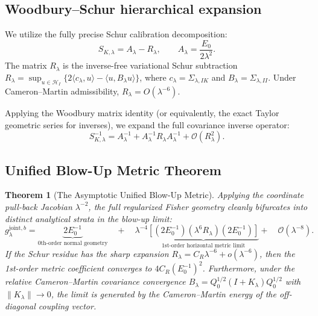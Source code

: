 \documentclass[11pt]{amsart}
\theoremstyle{plain}
\newtheorem{theorem}{Theorem}
\theoremstyle{definition}
\theoremstyle{remark}
\begin{document}
    \subsection{Woodbury--Schur hierarchical expansion}

    We utilize the fully precise Schur calibration decomposition:
    \begin{equation}
        S_{K,\lambda} = A_\lambda - R_\lambda, \qquad A_\lambda = \frac{E_0}{2\lambda^2}.
    \end{equation}
    The matrix $R_\lambda$ is the inverse-free variational Schur subtraction $R_\lambda = \sup_{u\in\mathcal H_I}\{2\langle c_\lambda,u\rangle-\langle u,B_\lambda u\rangle\}$, where $c_\lambda = \Sigma_{\lambda,IK}$ and $B_\lambda = \Sigma_{\lambda,II}$. Under Cameron--Martin admissibility, $R_\lambda = O(\lambda^{-6})$.

    Applying the Woodbury matrix identity (or equivalently, the exact Taylor geometric series for inverses), we expand the full covariance inverse operator:
    \begin{equation}
        S_{K,\lambda}^{-1} = A_\lambda^{-1} + A_\lambda^{-1} R_\lambda A_\lambda^{-1} + \mathcal{O}(R_\lambda^2).
    \end{equation}

    \subsection{Unified Blow-Up Metric Theorem}

    \begin{theorem}[The Asymptotic Unified Blow-Up Metric]
        \label{thm:unified_blowup_metric}
        Applying the coordinate pull-back Jacobian $\lambda^{-2}$, the full regularized Fisher geometry cleanly bifurcates into distinct analytical strata in the blow-up limit:
        \begin{equation}
            g_{\lambda}^{\mathrm{joint},b} = \underbrace{2 E_0^{-1}}_{\text{0th-order normal geometry}} \quad + \quad \lambda^{-4} \underbrace{\left[ (2E_0^{-1}) (\lambda^6 R_\lambda) (2E_0^{-1}) \right]}_{\text{1st-order horizontal metric limit}} + \quad \mathcal{O}(\lambda^{-8}).
        \end{equation}
        If the Schur residue has the sharp expansion $R_\lambda=C_R\lambda^{-6}+o(\lambda^{-6})$, then the 1st-order metric coefficient converges to $4 C_R (E_0^{-1})^2$. Furthermore, under the relative Cameron--Martin covariance convergence $B_\lambda = Q_0^{1/2}(I + K_\lambda)Q_0^{1/2}$ with $\|K_\lambda\| \to 0$, the limit is generated by the Cameron--Martin energy of the off-diagonal coupling vector.
    \end{theorem}
\end{document}
